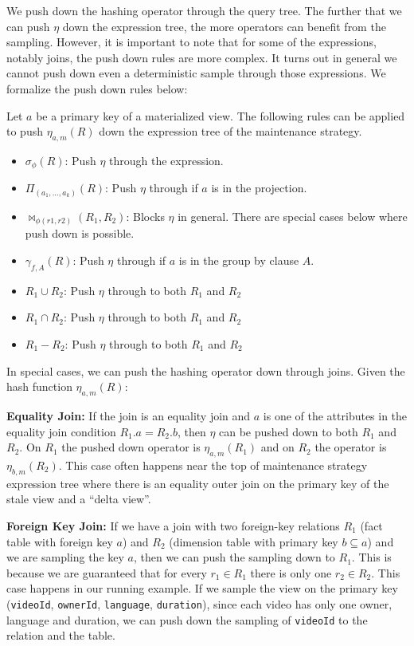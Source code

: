 We push down the hashing operator through the query tree.
The further that we can push $\eta$ down the expression tree, the more operators can benefit from the sampling.
However, it is important to note that for some of the expressions, notably joins, the push down rules are more complex. 
It turns out in general we cannot push down even a deterministic sample through those expressions.
We formalize the push down rules below:
\begin{definition}
Let $a$ be a primary key of a materialized view. The following rules can be applied to push $\eta_{a, m}(R)$ down the expression tree of the maintenance strategy. 
\begin{itemize}[noitemsep]
\item $\sigma_{\phi}(R)$: Push $\eta$ through the expression.  
\item $\Pi_{(a_1,...,a_k)}(R)$: Push $\eta $ through if $a$ is in the projection.
\item $\bowtie_{\phi (r1,r2)}(R_1,R_2)$: Blocks $\eta $ in general. There are special cases below where push down is possible.
\item $\gamma_{f,A}(R)$: Push $\eta $ through if $a$ is in the group by clause $A$.
\item $R_1 \cup R_2$: Push $\eta $ through to both $R_1$ and $R_2$
\item $R_1 \cap R_2$: Push $\eta $ through to both $R_1$ and $R_2$
\item $R_1 - R_2$: Push $\eta $ through to both $R_1$ and $R_2$
\end{itemize}
\end{definition}
In special cases, we can push the hashing operator down through joins. 
Given the hash function $\eta_{a, m}(R)$:
\vspace{.25em}

{\noindent \textbf{Equality Join:}} If the join is an equality join and $a$ is one of the attributes in the equality join condition $R_1.a = R_2.b$, then $\eta$ can be pushed down to both $R_1$ and $R_2$. On $R_1$ the pushed down operator is $\eta_{a, m}(R_1)$ and on $R_2$ the operator is $\eta_{b, m}(R_2)$. This case often happens near the top of maintenance strategy expression tree where there is an equality outer join on the primary key of the stale view and a ``delta view''.

\vspace{.25em}

{\noindent \textbf{Foreign Key Join:}} If we have a join with two foreign-key relations $R_1$ (fact table with foreign key $a$) and $R_2$ (dimension table with primary key $b \subseteq a$) and we are sampling the key $a$, then we can push the sampling down to $R_1$. This is because we are guaranteed that for every $r_1\in R_1$ there is only one $r_2 \in R_2$. This case happens in our running example. If we sample the view on the primary key (\texttt{videoId}, \texttt{ownerId}, \texttt{language}, \texttt{duration}), since each video has only one owner, language and duration, we can push down the sampling of \texttt{videoId} to the  relation and the  table.


